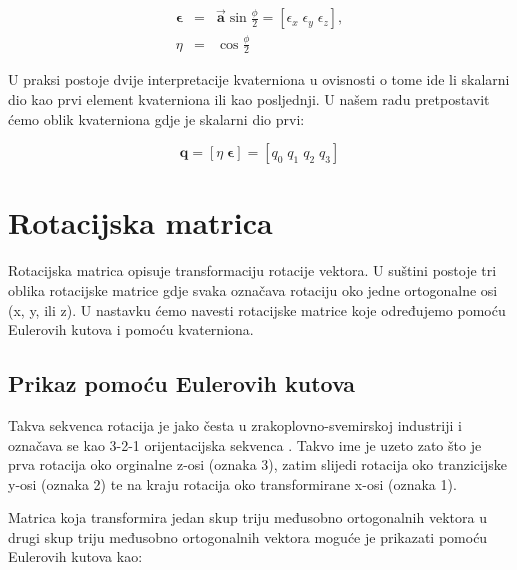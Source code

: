 \documentclass[times, utf8, diplomski, numeric]{templates/template}
\begin{document}
{{        \begin{equation}
        \begin{array}{rcl}
            \boldsymbol\epsilon &  = & \overrightarrow{\textbf{a}}\sin\frac{\phi}{2} = \left[\epsilon_{x} \; \epsilon_{y} \; \epsilon_{z} \right], \\
            \eta & = & \cos\frac{\phi}{2}
        \end{array}
        \end{equation}


        U praksi postoje dvije interpretacije kvaterniona u ovisnosti o tome ide li skalarni dio kao prvi element kvaterniona ili kao posljednji. U našem radu pretpostavit ćemo oblik kvaterniona gdje je skalarni dio prvi:

        \begin{equation}
            \textbf{q}=
            \left[\eta \; \boldsymbol\epsilon \right] = \left[q_{0} \; q_{1} \; q_{2} \; q_{3}\right]
        \end{equation}
    }

    \section{Rotacijska matrica}{
        Rotacijska matrica opisuje transformaciju rotacije vektora. U suštini postoje tri oblika rotacijske matrice gdje svaka označava rotaciju oko jedne ortogonalne osi (x, y, ili z). U nastavku ćemo navesti rotacijske matrice koje određujemo pomoću Eulerovih kutova i pomoću kvaterniona.

        \subsection{Prikaz pomoću Eulerovih kutova}{
            Takva sekvenca rotacija je jako česta u zrakoplovno-svemirskoj industriji i označava se kao 3-2-1 orijentacijska sekvenca . Takvo ime je uzeto zato što je prva rotacija oko orginalne z-osi (oznaka 3), zatim slijedi rotacija oko tranzicijske y-osi (oznaka 2) te na kraju rotacija oko transformirane x-osi (oznaka 1).

            Matrica koja transformira jedan skup triju međusobno ortogonalnih vektora u drugi skup triju međusobno ortogonalnih vektora moguće je prikazati pomoću Eulerovih kutova kao:

}}}
\end{document}
